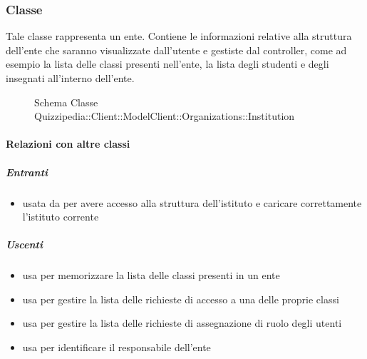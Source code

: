 \subsubsection{Classe }
Tale classe rappresenta un ente. Contiene le informazioni relative alla struttura dell'ente che saranno visualizzate dall'utente e gestiste dal controller, come ad esempio la lista delle classi presenti nell'ente, la lista degli studenti e degli insegnati all'interno dell'ente.
\begin{figure}[H]
\centering
\noindent{}
\caption[Schema Classe Institution]{Schema Classe Quizzipedia::Client::ModelClient::Organizations::Institution}
\end{figure}
\paragraph{Relazioni con altre classi}
\subparagraph{Entranti}
\begin{itemize}
\item usata da  per avere accesso alla struttura dell'istituto e caricare correttamente l'istituto corrente
\end{itemize}
\subparagraph{Uscenti}
\begin{itemize}
\item usa  per memorizzare la lista
delle classi presenti in un ente
\item usa  per gestire la lista delle richieste di accesso a una delle proprie classi
\item usa  per gestire la lista delle richieste di assegnazione di ruolo degli utenti
\item usa  per identificare il responsabile dell'ente
\end{itemize}
